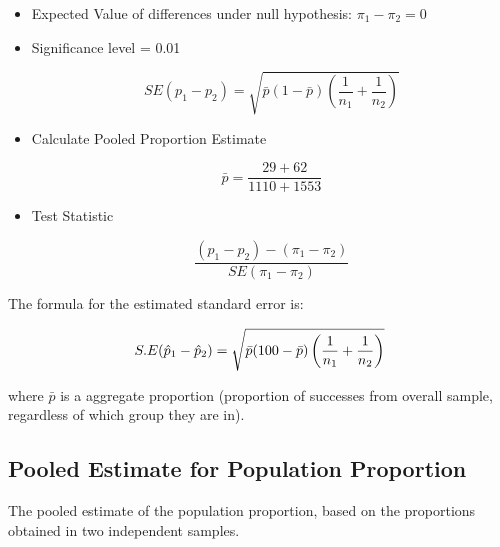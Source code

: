 \documentclass[]{report}
\begin{document}
\begin{itemize}
\item Expected Value of differences under null hypothesis: $\pi_1 - \pi_2 = 0$

\item Significance level = 0.01

\[SE(p_1 - p_2) = \sqrt{\bar{p}(1-\bar{p})\left( \frac{1}{n_1} + \frac{1}{n_2} \right)  }\]

\item Calculate Pooled Proportion Estimate

\[ \bar{p} = \frac{29 + 62}{1110 + 1553} \]

\item Test Statistic

\[ \frac{(p_1 - p_2) - (\pi_1 - \pi_2)}{SE(\pi_1 - \pi_2)} \]

\end{itemize}
%


\begin{framed}
The formula for the estimated standard error is:

\[ S.E (\hat{p}_1 - \hat{p}_2)  = \sqrt{\bar{p}(100- \bar{p}) \left( {1 \over n_1} + {1 \over n_2}  \right)} \]


where $\bar{p}$ is a aggregate proportion (proportion of successes from overall sample, regardless of which group they are in).
\end{framed}







\subsection{Pooled Estimate for Population Proportion}
The pooled estimate of the population proportion, based on the proportions obtained in two independent samples.
\end{document}
